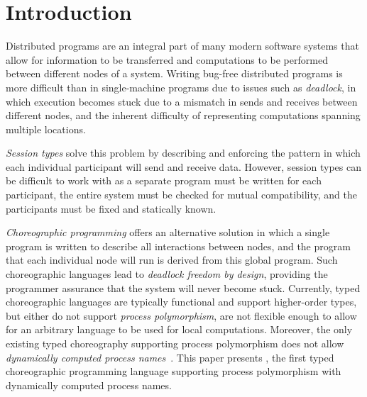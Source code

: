 \section{Introduction}
\label{sec:introduction}

Distributed programs are an integral part of many modern software systems that allow for information to be transferred and computations to be performed between different nodes of a system.
Writing bug-free distributed programs is more difficult than in single-machine programs due to issues such as \emph{deadlock}, in which execution becomes stuck due to a mismatch in sends and receives between different nodes, and the inherent difficulty of representing computations spanning multiple locations.

\emph{Session types} solve this problem by describing and enforcing the pattern in which each individual participant will send and receive data.
However, session types can be difficult to work with as a separate program must be written for each participant, the entire system must be checked for mutual compatibility, and the participants must be fixed and statically known.

\emph{Choreographic programming} offers an alternative solution in which a single program is written to describe all interactions between nodes, and the program that each individual node will run is derived from this global program.
Such choreographic languages lead to \emph{deadlock freedom by design}, providing the programmer assurance that the system will never become stuck.
Currently, typed choreographic languages are typically functional and support higher-order types, but either do not support \emph{process polymorphism},
are not flexible enough to allow for an arbitrary language to be used for local computations.
Moreover, the only existing typed choreography supporting process polymorphism does not allow \emph{dynamically computed process names}~\citep{aliceorbob}.
This paper presents \langname, the first typed choreographic programming language
supporting process polymorphism with dynamically computed process names.

